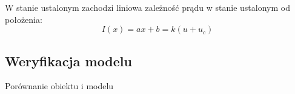 W stanie ustalonym zachodzi liniowa zależność prądu w stanie ustalonym od położenia:
\begin{equation}
I(x) = ax + b = k(u + u_c)
\end{equation}

\subsection{Weryfikacja modelu}

Porównanie obiektu i modelu 




